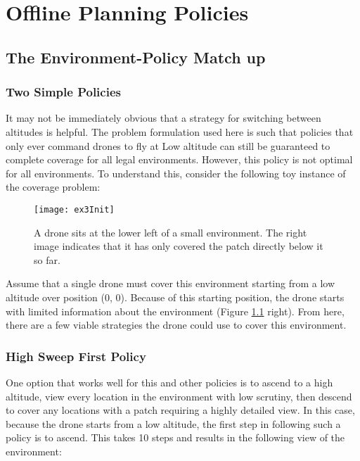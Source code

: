 \chapter{Offline Planning Policies}

\section{The Environment-Policy Match up}

\subsection{Two Simple Policies}

It may not be immediately obvious that a strategy for switching between altitudes is helpful. The problem formulation used here is such that policies that only ever command drones to fly at Low altitude can still be guaranteed to complete coverage for all legal environments. However, this policy is not optimal for all environments. To understand this, consider the following toy instance of the coverage problem:

\begin{figure}[H]
\texttt{[image: ex3Init]}
\caption[Tiny Square Environment]{A drone sits at the lower left of a small environment. The right image indicates that it has only covered the patch directly below it so far.}
\label{fig:ex3-1-start}
\end{figure}

Assume that a single drone must cover this environment starting from a low altitude over position (0, 0). Because of this starting position, the drone starts with limited information about the environment (Figure \ref{fig:ex3-1-start} right). From here, there are a few viable strategies the drone could use to cover this environment.

\subsection{High Sweep First Policy}

One option that works well for this and other policies is to ascend to a high altitude, view every location in the environment with low scrutiny, then descend to cover any locations with a patch requiring a highly detailed view. In this case, because the drone starts from a low altitude, the first step in following such a policy is to ascend. This takes 10 steps and results in the following view of the environment:

